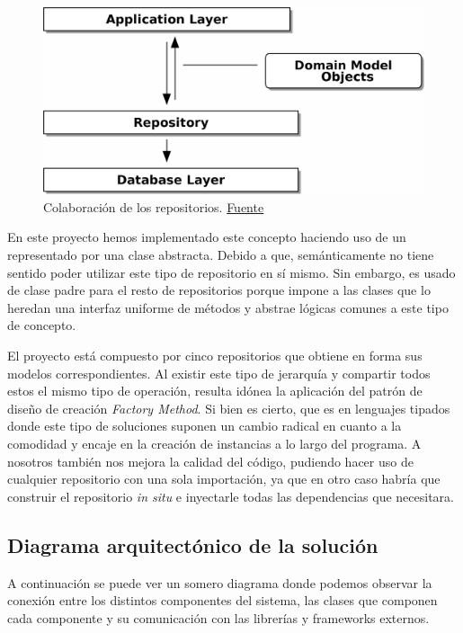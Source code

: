 \FloatBarrier
\begin{figure}[h]
	\centering	
	\includegraphics[width=\textwidth]{doc/logos/imgs/repopattern.png}
    \caption{Colaboración de los repositorios.
    \href{https://www.cosmicpython.com/book/images/apwp_0205.png}{Fuente} }
    \label{fig:repo-pattern}
\end{figure}
\FloatBarrier

En este proyecto hemos implementado este concepto haciendo uso de un
 representado por una clase abstracta. Debido a que,
semánticamente no tiene sentido poder utilizar este tipo de repositorio en sí mismo. Sin
embargo, es usado de clase padre para el resto de repositorios porque impone a las clases
que lo heredan una interfaz uniforme de métodos y abstrae lógicas comunes a este tipo de
concepto.

El proyecto está compuesto por cinco repositorios que obtiene en forma sus modelos
correspondientes. Al existir este tipo de jerarquía y compartir todos estos el mismo tipo
de operación, resulta idónea la aplicación del patrón de diseño de creación
\textit{Factory Method}. Si bien es cierto, que es en lenguajes tipados donde este tipo de
soluciones suponen un cambio radical en cuanto a la comodidad y encaje en la creación de
instancias a lo largo del programa. A nosotros también nos mejora la calidad del código,
pudiendo hacer uso de cualquier repositorio con una sola importación, ya que en otro caso
habría que construir el repositorio \textit{in situ} e inyectarle todas las dependencias
que necesitara.


\subsection{Diagrama arquitectónico de la solución}
A continuación se puede ver un somero diagrama donde podemos observar la conexión entre
los distintos componentes del sistema, las clases que componen cada componente y su comunicación
con las librerías y frameworks externos. 

